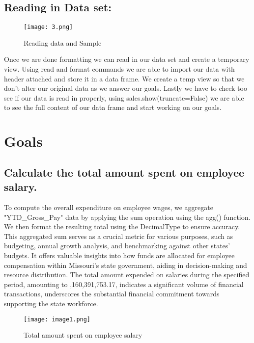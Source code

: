 \documentclass{article}
\begin{document}
 
\subsection{Reading in Data set:}
\begin{figure}[h!]
    \centering
    \texttt{[image: 3.png]}
    \caption{Reading data and Sample}
    \label{fig:enter-label}
\end{figure}
Once we are done formatting we can read in our data set and create a temporary view. Using read and format commands we are able to import our data with header attached and store it in a data frame. We create a temp view so that we don't alter our original data as we answer our goals. Lastly we have to check too see if our data is read in properly, using sales.show(truncate=False) we are able to see the full content of our data frame and start working on our goals.
\section{Goals}
\subsection{Calculate the total amount spent on employee salary. }


To compute the overall expenditure on employee wages, we aggregate "YTD\_Gross\_Pay" data by applying the sum operation using the agg() function. We then format the resulting total using the DecimalType to ensure accuracy.
This aggregated sum serves as a crucial metric for various purposes, such as budgeting, annual growth analysis, and benchmarking against other states' budgets. It offers valuable insights into how funds are allocated for employee compensation within Missouri's state government, aiding in decision-making and resource distribution. The total amount expended on salaries during the specified period, amounting to ,160,391,753.17, indicates a significant volume of financial transactions, underscores the substantial financial commitment towards supporting the state workforce.
\begin{figure}[h!]
    \centering
    \texttt{[image: image1.png]}
    \caption{Total amount spent on employee salary}
    \label{fig:enter-label}
\end{figure}
\end{document}
